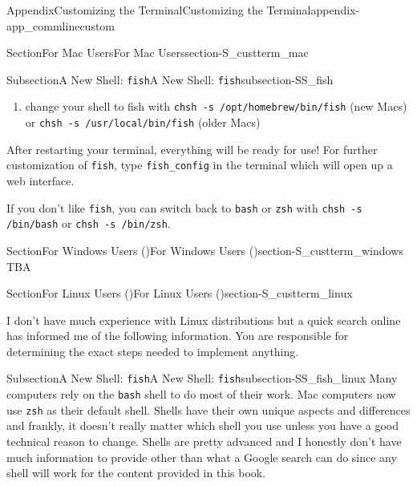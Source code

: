 \documentclass[oneside,10pt,]{book}
\newcommand{\mono}[1]{\texttt{#1}}
\begin{document}
\begin{appendixptx}{Appendix}{Customizing the Terminal}{}{Customizing the Terminal}{}{}{appendix-app_commlinecustom}
\begin{sectionptx}{Section}{For Mac Users}{}{For Mac Users}{}{}{section-S_custterm_mac}
\begin{subsectionptx}{Subsection}{A New Shell: \mono{fish}}{}{A New Shell: \mono{fish}}{}{}{subsection-SS_fish}
\begin{enumerate}
\item{}change your shell to fish with \mono{chsh -s /opt/homebrew/bin/fish} (new Macs) or \mono{chsh -s /usr/local/bin/fish} (older Macs)%
\end{enumerate}
After restarting your terminal, everything will be ready for use! For further customization of \mono{fish}, type \mono{fish\_config} in the terminal which will open up a web interface.%
\par
If you don't like \mono{fish}, you can switch back to \mono{bash} or \mono{zsh} with \mono{chsh -s /bin/bash} or \mono{chsh -s /bin/zsh}.%
\end{subsectionptx}
\end{sectionptx}
%
%
\typeout{************************************************}
\typeout{************************************************}
%
\begin{sectionptx}{Section}{For Windows Users (\textasteriskcentered{})}{}{For Windows Users (\textasteriskcentered{})}{}{}{section-S_custterm_windows}
%
TBA%
\end{sectionptx}
%
%
\typeout{************************************************}
\typeout{************************************************}
%
\begin{sectionptx}{Section}{For Linux Users (\textasteriskcentered{})}{}{For Linux Users (\textasteriskcentered{})}{}{}{section-S_custterm_linux}
%
\begin{introduction}{}%
I don't have much experience with Linux distributions but a quick search online has informed me of the following information. You are responsible for determining the exact steps needed to implement anything.%
\end{introduction}%
%
%
\typeout{************************************************}
\typeout{Subsection A.3.1 A New Shell: \mono{fish}}
\typeout{************************************************}
%
\begin{subsectionptx}{Subsection}{A New Shell: \mono{fish}}{}{A New Shell: \mono{fish}}{}{}{subsection-SS_fish_linux}
%
%
Many computers rely on the \mono{bash} shell to do most of their work. Mac computers now use \mono{zsh} as their default shell. Shells have their own unique aspects and differences and frankly, it doesn't really matter which shell you use unless you have a good technical reason to change. Shells are pretty advanced and I honestly don't have much information to provide other than what a Google search can do since any shell will work for the content provided in this book.%

\end{subsectionptx}
\end{sectionptx}
\end{appendixptx}
\end{document}
